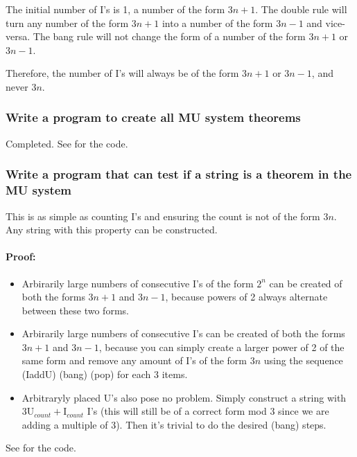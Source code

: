 \documentclass{article}
\begin{document}
The initial number of I's is 1, a number of the form $3n+1$.
The double rule will turn any number of the form $3n+1$ into
a number of the form $3n-1$ and vice-versa.
The bang rule will not change the form of a number of the form
$3n+1$ or $3n-1$.

Therefore, the number of I's will always be of the form
$3n+1$ or $3n-1$, and never $3n$.

\subsubsection{Write a program to create all MU system theorems}
Completed. See  for the code.

\subsubsection{Write a program that can test if a string is a
theorem in the MU system}
This is as simple as counting I's and ensuring the count is not
of the form $3n$. Any string with this property can be constructed.

\paragraph{Proof:}

\begin{itemize}
	\item Arbirarily large numbers of consecutive I's
		of the form $2^n$ can be
		created of both the forms $3n+1$ and $3n-1$, because
		powers of 2 always alternate between these two forms.

	\item Arbirarily large numbers of consecutive I's can be
		created of both the forms $3n+1$ and $3n-1$, because you
		can simply create a larger power of 2 of the same form
		and remove any amount of I's of the form $3n$ using the
		sequence (IaddU) (bang) (pop) for each 3 items.
	
	\item Arbitraryly placed U's also pose no problem. Simply
		construct a string with
		$3\text{U}_{count}+\text{I}_{count}$
		I's (this will still be of a correct form mod 3
		since we are adding a multiple of 3).
		Then it's trivial to do the desired (bang) steps.
	
\end{itemize}

See  for the code.

\pagebreak


\end{document}

